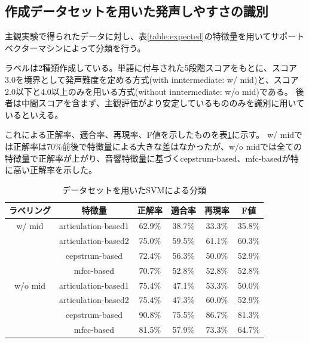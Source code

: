 \documentclass[10.5ptj,a4j,dvipdfmx,uplatex, oneside, openany, report]{jsbook}%
\begin{document}
\subsection{作成データセットを用いた発声しやすさの識別}
主観実験で得られたデータに対し、表\ref{table:expected}の特徴量を用いてサポートベクターマシンによって分類を行う。

ラベルは2種類作成している。単語に付与された5段階スコアをもとに、スコア3.0を境界として発声難度を定める方式(with inntermediate: w/ mid)と、スコア2.0以下と4.0以上のみを用いる方式(without inntermediate: w/o mid)である。
後者は中間スコアを含まず、主観評価がより安定しているもののみを識別に用いているといえる。

これによる正解率、適合率、再現率、F値を示したものを表\ref{table:SVM}に示す。
w/ midでは正解率は70\%前後で特徴量による大きな差はなかったが、w/o midでは全ての特徴量で正解率が上がり、音響特徴量に基づくcepstrum-based、mfc-basedが特に高い正解率を示した。

\begin{table}[t]
    \small
    \caption{データセットを用いたSVMによる分類}
    \label{table:SVM}
    \centering
\begin{tabular}{cccccc}
    \hline
    ラベリング & 特徴量 & 正解率 & 適合率 & 再現率 & F値\\
    \hline \hline
    w/ mid & articulation-based1 & 62.9\% & 38.7\% & 33.3\% & 35.8\%\\
    & articulation-based2 & 75.0\% & 59.5\% & 61.1\% & 60.3\%\\
    & cepstrum-based & 72.4\% & 56.3\% & 50.0\% & 52.9\%\\
    & mfcc-based & 70.7\% & 52.8\% & 52.8\% & 52.8\%\\
    \hline
    w/o mid & articulation-based1 & 75.4\% & 47.1\% & 53.3\% & 50.0\%\\
    & articulation-based2 & 75.4\% & 47.3\% & 60.0\% & 52.9\%\\
    & cepstrum-based & 90.8\% & 75.5\% & 86.7\% & 81.3\%\\
    & mfcc-based & 81.5\% & 57.9\% & 73.3\% & 64.7\%\\
    \hline

\end{tabular}
\end{table}
\end{document}
